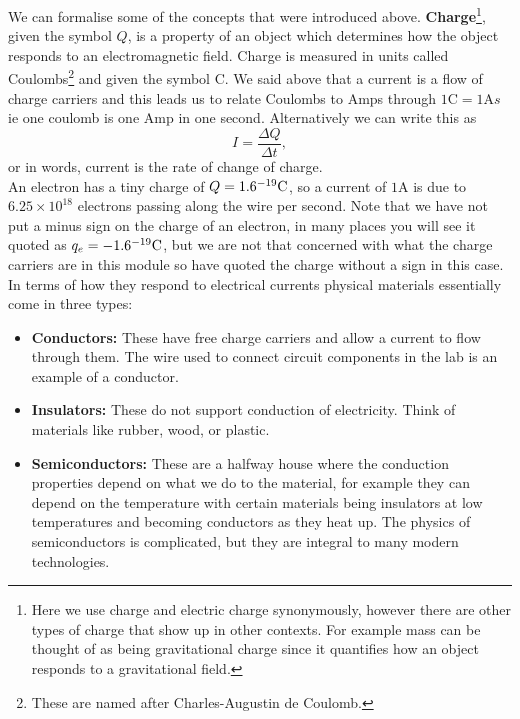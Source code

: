 \documentclass[a4paper,12pt]{book}
\begin{document}
We can formalise some of the concepts that were introduced above. \textbf{Charge}\footnote{Here we use charge and electric charge synonymously, however there are other types of charge that show up in other contexts. For example mass can be thought of as being gravitational charge since it quantifies how an object responds to a gravitational field.}, given the symbol $Q$, is a property of an object which determines how the object responds to an electromagnetic field. Charge is measured in units called Coulombs\footnote{These are named after Charles-Augustin de Coulomb.} and given the symbol $\text{C}$. We said above that a current is a flow of charge carriers and this leads us to relate Coulombs to Amps through $1\text{C}=1\text{A}s$ ie one coulomb is one Amp in one second. Alternatively we can write this as
\begin{equation}
I=\frac{\Delta Q}{\Delta t},
\label{eq: current definition}
\end{equation}
or in words, current is the rate of change of charge.\\

An electron has a tiny charge of $Q=1.6\time10^{-19}\text{C}$, so a current of $1\text{A}$ is due to $6.25\times 10^{18}$ electrons passing along the wire per second. Note that we have not put a minus sign on the charge of an electron, in many places you will see it quoted as $q_{e}=-1.6\time10^{-19}\text{C}$, but we are not that concerned with what the charge carriers are in this module so have quoted the charge without a sign in this case.\\

In terms of how they respond to electrical currents physical materials essentially come in three types:
\begin{itemize}
\setlength{\itemsep}{-5pt}
    \item \textbf{Conductors:} These have free charge carriers and allow a current to flow through them. The wire used to connect circuit components in the lab is an example of a conductor.
    \item \textbf{Insulators:} These do not support conduction of electricity. Think of materials like rubber, wood, or plastic.
    \item \textbf{Semiconductors:} These are a halfway house where the conduction properties depend on what we do to the material, for example they can depend on the temperature with certain materials being insulators at low temperatures and becoming conductors as they heat up. The physics of semiconductors is complicated, but they are integral to many modern technologies.
\end{itemize}  
\end{document}
